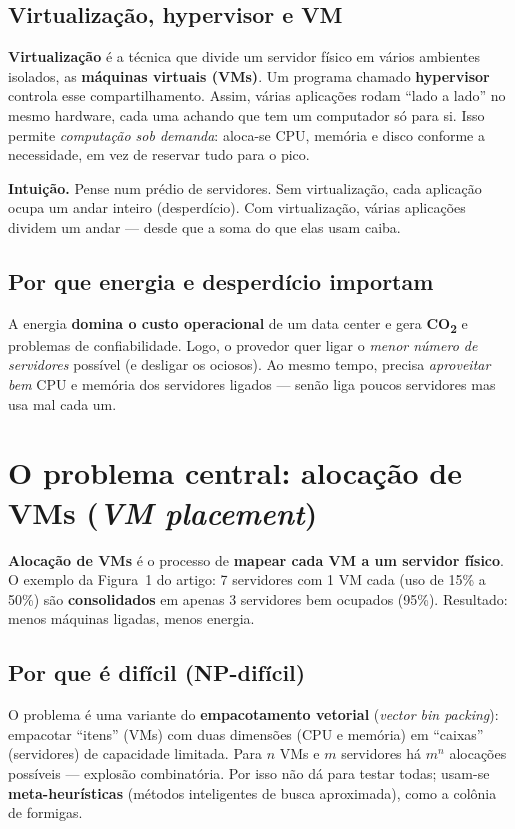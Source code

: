 \documentclass[11pt]{article}
\newcommand{\var}[1]{\textcolor{azul}{$#1$}}
\begin{document}
\subsection{Virtualização, hypervisor e VM}
\textbf{Virtualização} é a técnica que divide um servidor físico em vários
ambientes isolados, as \textbf{máquinas virtuais (VMs)}. Um programa chamado
\textbf{hypervisor} controla esse compartilhamento. Assim, várias aplicações
rodam ``lado a lado'' no mesmo hardware, cada uma achando que tem um computador
só para si. Isso permite \emph{computação sob demanda}: aloca-se CPU, memória e
disco conforme a necessidade, em vez de reservar tudo para o pico.

\begin{ideia}
\textbf{Intuição.} Pense num prédio de servidores. Sem virtualização, cada
aplicação ocupa um andar inteiro (desperdício). Com virtualização, várias
aplicações dividem um andar — desde que a soma do que elas usam caiba.
\end{ideia}

\subsection{Por que energia e desperdício importam}
A energia \textbf{domina o custo operacional} de um data center e gera
\textbf{CO\textsubscript{2}} e problemas de confiabilidade. Logo, o provedor quer
ligar o \emph{menor número de servidores} possível (e desligar os ociosos). Ao
mesmo tempo, precisa \emph{aproveitar bem} CPU e memória dos servidores ligados
— senão liga poucos servidores mas usa mal cada um.

\section{O problema central: alocação de VMs (\emph{VM placement})}
\textbf{Alocação de VMs} é o processo de \textbf{mapear cada VM a um servidor
físico}. O exemplo da Figura~1 do artigo: 7 servidores com 1 VM cada (uso de
15\% a 50\%) são \textbf{consolidados} em apenas 3 servidores bem ocupados
(95\%). Resultado: menos máquinas ligadas, menos energia.

\subsection{Por que é difícil (NP-difícil)}
O problema é uma variante do \textbf{empacotamento vetorial}
(\emph{vector bin packing}): empacotar ``itens'' (VMs) com duas dimensões (CPU e
memória) em ``caixas'' (servidores) de capacidade limitada. Para \var{n} VMs e
\var{m} servidores há \var{m^n} alocações possíveis — explosão combinatória.
Por isso não dá para testar todas; usam-se \textbf{meta-heurísticas} (métodos
inteligentes de busca aproximada), como a colônia de formigas.
\end{document}
